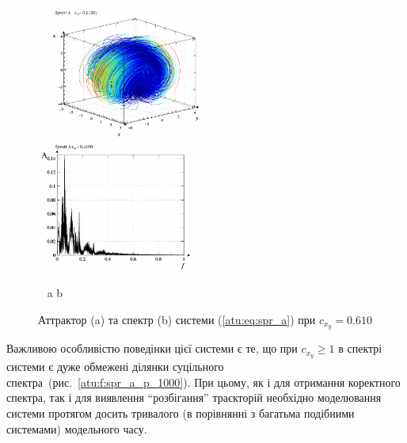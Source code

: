 \begin{figure}[htb!]
\centerline{
  ~ \hfill
  \includegraphics[width=0.49\textwidth]{p/cha/spr_a/sprott_a-p_xyz_cx_y=0x610.png}
  \hfill
  \includegraphics[width=0.49\textwidth]{p/cha/spr_a/sprott_a_f-p_f_cx_y=0x610.png}
  \hfill ~
}
\vspace{-1.5ex}
\begin{center}
  ~ \hfill a \hfill\hfill b \hfill ~
\end{center}
\vspace{-2.5ex}
\caption{Аттрактор (a) та спектр (b) системи (\ref{atu:eq:spr_a}) при $c_{x_y} =0.610$}
\label{atu:f:spr_a_p_0610}
\end{figure}




Важливою особливістю поведінки цієї системи є те, що при
$ c_{x_y} \ge 1 $ в спектрі системи є дуже обмежені ділянки суцільного
спектра~(рис.~\ref{atu:f:spr_a_p_1000}). При цьому, як і для отримання
коректного спектра, так і для виявлення ``розбігання'' траєкторій
необхідно моделювання системи протягом досить тривалого (в
порівнянні з багатьма подібними системами) модельного часу.

